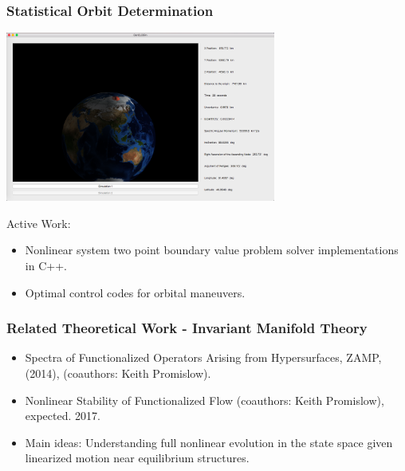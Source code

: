 \documentclass[mathserif]{beamer}
\begin{document}
\begin{frame}
\frametitle{Statistical Orbit Determination}

\includegraphics[width=3.5in]{sat2.png}

Active Work:

\begin{itemize}
\item Nonlinear system two point boundary value problem solver implementations in C++.
\item Optimal control codes for orbital maneuvers.
\end{itemize}

\end{frame}

\begin{frame}
\frametitle{Related Theoretical Work - Invariant Manifold Theory}

\begin{itemize}
\item Spectra of Functionalized Operators Arising from Hypersurfaces, ZAMP, (2014),
(coauthors: Keith Promislow).

\item Nonlinear Stability of Functionalized Flow  (coauthors: Keith Promislow), expected. 2017.

\item Main ideas:  Understanding full nonlinear evolution in the state space given linearized motion near equilibrium structures.

\end{itemize}



\end{frame}
\end{document}
